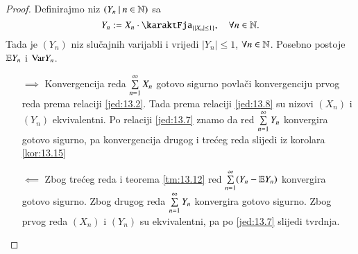 \begin{proof}
    Definirajmo niz $({Y_n} \: | \: {n \in \mathbb{N}})$ sa
    \begin{equation*}
        Y_n := X_n \cdot \karaktFja_{\{ |X_n| \leq 1 \}}, \quad \forall n \in \nat.
    \end{equation*}
    Tada je $(Y_n)$ niz slu\v cajnih varijabli i vrijedi $|Y_n| \leq 1$, $\forall n \in \mathbb{N}$. Posebno postoje $\mathbb{E} Y_n$ i $\mathrm{Var} Y_n$.
    \begin{itemize}
        \item[$\implies$]
        Konvergencija reda $\sum\limits_{n = 1}^{\infty} X_n$ gotovo sigurno povla\v ci konvergenciju prvog reda prema relaciji \eqref{jed:13.2}.
        Tada prema relaciji \eqref{jed:13.8} su nizovi $(X_n)$ i $(Y_n)$ ekvivalentni.
        Po relaciji \eqref{jed:13.7} znamo da red $\sum\limits_{n = 1}^{\infty} Y_n$ konvergira gotovo sigurno, pa konvergencija drugog i tre\' ceg reda slijedi iz korolara \ref{kor:13.15}
        \item[$\impliedby$]
        Zbog tre\' ceg reda i teorema \ref{tm:13.12} red $\sum\limits_{n = 1}^{\infty} (Y_n - \mathbb{E} Y_n)$ konvergira gotovo sigurno.
        Zbog drugog reda $\sum\limits_{n = 1}^{\infty} Y_n$ konvergira gotovo sigurno. Zbog prvog reda $(X_n)$ i $(Y_n)$ su ekvivalentni, pa po \eqref{jed:13.7} slijedi tvrdnja. 
    \end{itemize}
\end{proof}